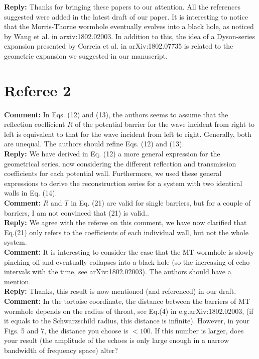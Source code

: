 \documentclass[preprintnumbers,floats,floatfix,amssymb,prd,onecolumn,superscriptaddress,nofootinbib]{revtex4}
\begin{document}
\textbf{Reply:}
Thanks for bringing these papers to our attention. All the references suggested were added in the latest draft of our paper. It is interesting to notice that the Morris-Thorne wormhole eventually evolves into a black hole, as noticed by Wang et al. in arxiv:1802.02003. In addition to this, the idea of a Dyson-series expansion presented by Correia et al. in arXiv:1802.07735 is related to the geometric expansion we suggested in our manuscript.\\ 

\section{Referee 2}

\textbf{Comment:} In Eqs. (12) and (13), the authors seems to assume that the reflection coefficient $R$ of the potential barrier for the wave incident from right to left is equivalent to that for the wave incident from left to right. Generally, both are unequal. The authors should refine Eqs. (12) and (13).\\

\textbf{Reply:} We have derived in Eq. (12) a more general expression for the geometrical series, now considering the different reflection and transmission coefficients for each potential wall. Furthermore, we used these general expressions to derive the reconstruction series for a system with two identical walls in Eq. (14).\\
 
\textbf{Comment:} $R$ and $T$ in Eq. (21) are valid for single barriers, but for a couple of barriers, I am not convinced that (21) is valid..\\  
  
\textbf{Reply:} We agree with the referee on this comment, we have now clarified that Eq.(21) only refers to the coefficients of each individual wall, but not the whole system.\\

\textbf{Comment:} It is interesting to consider the case that the MT wormhole is slowly pinching off and eventually collapses into a black hole (so the increasing of echo intervals with the time, see arXiv:1802.02003). The authors should have a mention.   \\

\textbf{Reply:} Thanks, this result is now mentioned (and referenced) in our draft.\\

\textbf{Comment:} In the tortoise coordinate, the distance between the barriers of MT wormhole depends on the radius of throat, see Eq.(4) in e.g.arXiv:1802.02003, (if it equals to the 
Schwarzschild radius, this distance is infinite). However, in your Figs. 5 and 7, the distance you choose is $<100$. If this number is larger, does your result (the amplitude of the echoes is only large enough in a narrow bandwidth of frequency space) alter?\\
\end{document}
